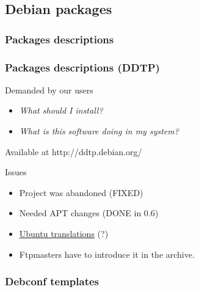 \documentclass{beamer}
\begin{document}

\subsection{Debian packages}

\subsubsection{Packages descriptions}

\begin{frame}
  \frametitle{Packages descriptions (DDTP)}
	\begin{block}
		{Demanded by our users}
		\begin{itemize}
		\item {\em What should I install?}
		\item {\em What is this software doing in my system?}
		\end{itemize}
	\end{block}
	\begin{block}
		{Available at http://ddtp.debian.org/}
	\end{block}
	\begin{block}
		{Issues}
		\begin{itemize}
		\item Project was abandoned (FIXED)
		\item Needed APT changes (DONE in 0.6)
		\item \href{https://launchpad.net/products/ddtp-ubuntu/+translations}{Ubuntu translations} (?)
		\item Ftpmasters have to introduce it in the archive.
		\end{itemize}
	\end{block}
\end{frame}




\subsubsection{Debconf templates}
\end{document}
